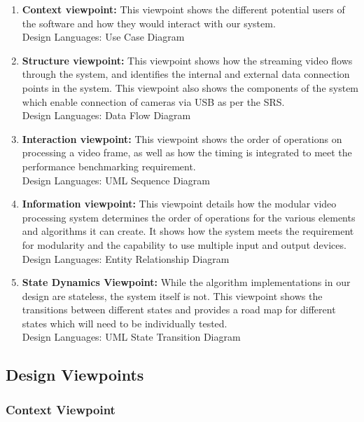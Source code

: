 \begin{enumerate}[leftmargin=2cm,labelindent=2cm]
\item \textbf{Context viewpoint:}
This viewpoint shows the different potential users of the software and how they would
interact with our system.\\
Design Languages: Use Case Diagram
\item \textbf{Structure viewpoint:}
This viewpoint shows how the streaming video flows through the system, and identifies the
internal and external data connection points in the system. This viewpoint also shows the
components of the system which enable connection of cameras via USB as per the SRS.\\
Design Languages: Data Flow Diagram
\item \textbf{Interaction viewpoint:}
This viewpoint shows the order of operations on processing a video frame, as well as how
the timing is integrated to meet the performance benchmarking requirement.\\
Design Languages: UML Sequence Diagram
\item \textbf{Information viewpoint:}
This viewpoint details how the modular video processing system determines the order of
operations for the various elements and algorithms it can create. It shows how the system
meets the requirement for modularity and the capability to use multiple input and output
devices.\\
Design Languages: Entity Relationship Diagram
\item \textbf{State Dynamics Viewpoint:}
While the algorithm implementations in our design are stateless, the system itself is not.
This viewpoint shows the transitions between different states and provides a road map for
different states which will need to be individually tested.\\
Design Languages: UML State Transition Diagram
\end{enumerate}

\subsection{Design Viewpoints}
\subsubsection{Context Viewpoint}

